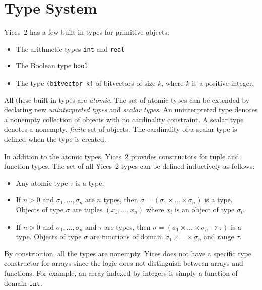 \documentclass[11pt,twoside,fleqn,openright,titlepage]{cslreport}
\begin{document}
\section{Type System}
\label{type-system}

Yices~2 has a few built-in types for primitive objects:
\begin{itemize}
\item The arithmetic types \texttt{int} and \texttt{real}
\item The Boolean type \texttt{bool}
\item The type \texttt{(bitvector k)} of bitvectors of size $k$,
 where $k$ is a positive integer.
\end{itemize}
All these built-in  types are {\em atomic\/}. The  set of atomic types
can be extended by declaring  new {\em uninterpreted types\/} and {\em
  scalar types\/}. An uninterpreted type denotes a nonempty collection
of objects  with no  cardinality constraint. A  scalar type  denotes a
nonempty, {\em finite\/}  set of objects. The cardinality  of a scalar
type is defined when the type is created.

\medskip\noindent
In  addition to the  atomic types,  Yices~2 provides  constructors for
tuple and function types. The set  of all Yices~2 types can be defined
inductively as follows:
\begin{itemize}
\item Any atomic type $\tau$ is a type.
\item  If $n>0$  and  $\sigma_1,\ldots,\sigma_n$ are  $n$ types,  then
  $\sigma   =  (\sigma_1   \times  \ldots   \times  \sigma_n)$   is  a
  type. Objects of type  $\sigma$ are tuples $(x_1,\ldots, x_n)$ where
  $x_i$ is an object of type $\sigma_i$.
\item If  $n>0$ and  $\sigma_1,\ldots,\sigma_n$ and $\tau$  are types,
  then  $\sigma  =  (\sigma_1\times  \ldots\times\sigma_n  \rightarrow
  \tau)$ is a  type. Objects of type $\sigma$  are functions of domain
  $\sigma_1\times\ldots\times\sigma_n$ and range $\tau$.
\end{itemize}
By construction,  all the  types are nonempty.  Yices does not  have a
specific  type  constructor  for  arrays  since  the  logic  does  not
distinguish  between  arrays  and  functions. For  example,  an  array
indexed by integers is simply a function of domain $\mathtt{int}$.
\end{document}
